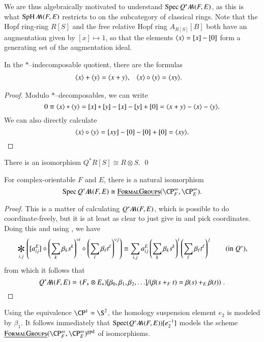 We are thus algebraically motivated to understand $\Spec Q^* \AA(F, E)$, as this is what $\SpH \AA(F, E)$ restricts to on the subcategory of classical rings.  Note that the Hopf ring-ring $R[S]$ and the free relative Hopf ring $A_{R[S]}[B]$ both have an augmentation given by $[x] \mapsto 1$, so that the elements $\<x\> = [x] - [0]$ form a generating set of the augmentation ideal.
\begin{lemma}\label{ArithmeticInQAst}
In the $\ast$--indecomposable quotient, there are the formulas
\begin{align*}
\<x\> + \<y\> & = \<x + y\>, &
\<x\> \circ \<y\> & = \<x y\>.
\end{align*}
\end{lemma}
\begin{proof}
Modulo $\ast$--decomposables, we can write \[0 \equiv \<x\> \ast \<y\> = [x] \ast [y] - [x] - [y] + [0] = \<x + y\> - \<x\> - \<y\>.\]  We can also directly calculate \[\<x\> \circ \<y\> = [x y] - [0] - [0] + [0] = \<x y\>. \qedhere\]
\end{proof}

\begin{corollary}\label{QAstAndTensors}
There is an isomorphism $Q^* R[S] \cong R \otimes S$. \qed
\end{corollary}

\begin{corollary}
For complex-orientable $F$ and $E$, there is a natural isomorphism \[\Spec Q^* \AA(F, E) \cong \InternalHom{FormalGroups}(\CP^\infty_F, \CP^\infty_E).\]
\end{corollary}
\begin{proof}
This is a matter of calculating $Q^* \AA(F, E)$, which is possible to do coordinate-freely, but it is at least as clear to just give in and pick coordinates.  Doing this and using , we have \[\bigast_{i, j} \left([a_{ij}^E] \circ \left( \sum_k \beta_k s^k \right)^{\circ i} \circ \left( \sum_\ell \beta_\ell t^\ell \right)^{\circ j} \right) \equiv \sum_{i, j} a_{ij}^E \left( \sum_k \beta_k s^k \right)^i \left( \sum_\ell \beta_\ell t^\ell \right)^j \tag{in $Q^*$},\] from which it follows that \[Q^* \AA(F, E) = \left. (F_* \otimes E_*)[\beta_0, \beta_1, \beta_2, \ldots] \middle/ \left( \beta(s +_F t) = \beta(s) +_E \beta(t) \right) \right. . \qedhere\]
\end{proof}

\begin{remark}
Using the equivalence $\CP^1 \simeq \S^2$, the homology suspension element $e_2$ is modeled by $\beta_1$.  It follows immediately that $\Spec (Q^* \AA(F, E))[e_2^{-1}]$ models the scheme $\InternalHom{FormalGroups}(\CP^\infty_F, \CP^\infty_E)^{\mathrm{gpd}}$ of isomorphisms.
\end{remark}

